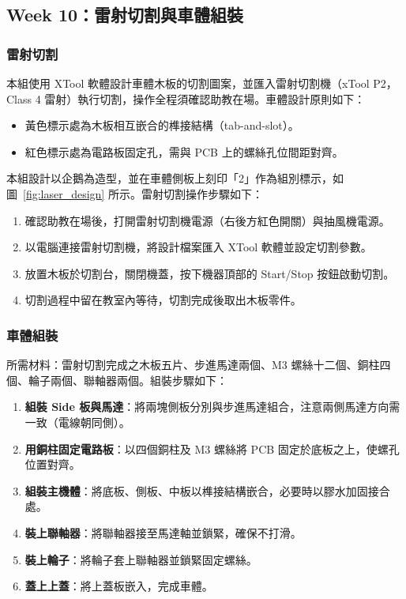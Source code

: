 \documentclass[12pt]{article}
\begin{document}
\subsection{Week 10：雷射切割與車體組裝}

\subsubsection{雷射切割}

本組使用 XTool 軟體設計車體木板的切割圖案，並匯入雷射切割機（xTool P2，Class 4 雷射）執行切割，操作全程須確認助教在場。車體設計原則如下：

\begin{itemize}
    \item 黃色標示處為木板相互嵌合的榫接結構（tab-and-slot）。
    \item 紅色標示處為電路板固定孔，需與 PCB 上的螺絲孔位間距對齊。
\end{itemize}

本組設計以企鵝為造型，並在車體側板上刻印「2」作為組別標示，如圖~\ref{fig:laser_design} 所示。雷射切割操作步驟如下：

\begin{enumerate}
    \item 確認助教在場後，打開雷射切割機電源（右後方紅色開關）與抽風機電源。
    \item 以電腦連接雷射切割機，將設計檔案匯入 XTool 軟體並設定切割參數。
    \item 放置木板於切割台，關閉機蓋，按下機器頂部的 Start/Stop 按鈕啟動切割。
    \item 切割過程中留在教室內等待，切割完成後取出木板零件。
\end{enumerate}

\subsubsection{車體組裝}

所需材料：雷射切割完成之木板五片、步進馬達兩個、M3 螺絲十二個、銅柱四個、輪子兩個、聯軸器兩個。組裝步驟如下：

\begin{enumerate}
    \item \textbf{組裝 Side 板與馬達}：將兩塊側板分別與步進馬達組合，注意兩側馬達方向需一致（電線朝同側）。
    \item \textbf{用銅柱固定電路板}：以四個銅柱及 M3 螺絲將 PCB 固定於底板之上，使螺孔位置對齊。
    \item \textbf{組裝主機體}：將底板、側板、中板以榫接結構嵌合，必要時以膠水加固接合處。
    \item \textbf{裝上聯軸器}：將聯軸器接至馬達軸並鎖緊，確保不打滑。
    \item \textbf{裝上輪子}：將輪子套上聯軸器並鎖緊固定螺絲。
    \item \textbf{蓋上上蓋}：將上蓋板嵌入，完成車體。
\end{enumerate}
\end{document}
